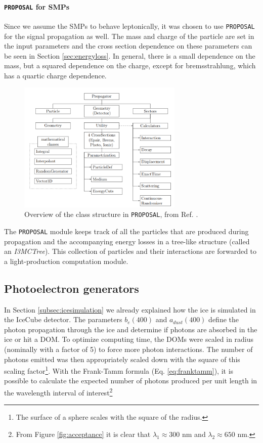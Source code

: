 \paragraph{\texttt{PROPOSAL} for SMPs}
Since we assume the SMPs to behave leptonically, it was chosen to use \texttt{PROPOSAL} for the signal propagation as well. The mass and charge of the particle are set in the input parameters and the cross section dependence on these parameters can be seen in Section \ref{sec:energyloss}. In general, there is a small dependence on the mass, but a squared dependence on the charge, except for bremsstrahlung, which has a quartic charge dependence.\\

\begin{figure}
\centering
\includegraphics[width=0.7\textwidth]{chapter6/img/proposal.png}
\caption{Overview of the class structure in \texttt{PROPOSAL}, from Ref. \cite{Dunsch:2018nsc}.}
\label{fig:proposal}
\end{figure}

\noindent The \texttt{PROPOSAL} module keeps track of all the particles that are produced during propagation and the accompanying energy losses in a tree-like structure (called an \textit{I3MCTree}). This collection of particles and their interactions are forwarded to a light-production computation module.

\subsection{Photoelectron generators}
In Section \ref{subsec:icesimulation} we already explained how the ice is simulated in the IceCube detector. The parameters $b_e(400)$ and $a_{dust}(400)$ define the photon propagation through the ice and determine if photons are absorbed in the ice or hit a DOM. To optimize computing time, the DOMs were scaled in radius (nominally with a factor of 5) to force more photon interactions. The number of photons emitted was then appropriately scaled down with the square of this scaling factor\footnote{The surface of a sphere scales with the square of the radius.}. With the Frank-Tamm formula (Eq. \ref{eq:franktamm}), it is possible to calculate the expected number of photons produced per unit length in the wavelength interval of interest\footnote{From Figure \ref{fig:acceptance} it is clear that $\lambda_1 \approx 300$ nm and $\lambda_2 \approx 650$ nm.}

